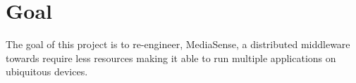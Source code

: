 \section{Goal}
The goal of this project is to re-engineer, MediaSense, a distributed middleware towards require less resources making it able to run multiple applications on ubiquitous devices. 
